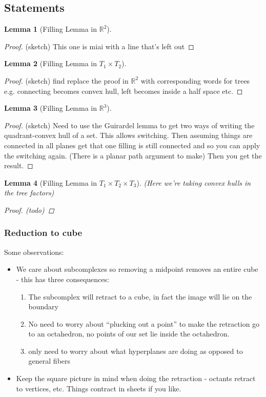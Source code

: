 \documentclass{article}
\theoremstyle{mystyle}
\newtheorem{lem}{Lemma}[section]
\theoremstyle{remark}
\begin{document}
\subsection{Statements}

\begin{lem}
    [Filling Lemma in \(\mathbb{R}^{2}\)]
\end{lem}
\begin{proof}
    (sketch) This one is miai with a line that's left out
\end{proof}
\begin{lem}
    [Filling Lemma in \(T_{1} \times T_{2}\)]
\end{lem}
\begin{proof}
    (sketch) find replace the proof in \(\mathbb{R}^{2}\) with corresponding words for trees e.g. connecting becomes convex hull, left becomes inside a half space etc.
\end{proof}
\begin{lem}
    [Filling Lemma in \(\mathbb{R}^{3}\)]
\end{lem}
\begin{proof}
    (sketch) Need to use the Guirardel lemma to get two ways of writing the quadrant-convex hull of a set. This allows switching. Then assuming things are connected in all planes get that one filling is still connected and so you can apply the switching again. (There is a planar path argument to make) Then you get the result.
\end{proof}
\begin{lem}
    [Filling Lemma in \(T_{1} \times T_{2} \times T_{3}\)]
    (Here we're taking convex hulls in the tree factors)
\begin{proof}
    (todo)
\end{proof}
\end{lem}


\subsubsection{Reduction to cube}

Some observations:
\begin{itemize}
	\item We care about subcomplexes so removing a midpoint removes an entire cube - this has three consequences:
		\begin{enumerate}
			\item The subcomplex will retract to a cube, in fact the image will lie on the boundary
			\item No need to worry about ``plucking out a point'' to make the retraction go to an octahedron, no points of our set lie inside the octahedron.
			\item only need to worry about what hyperplanes are doing as opposed to general fibers
		\end{enumerate}
	\item Keep the square picture in mind when doing the retraction - octants retract to vertices, etc. Things contract in sheets if you like.
\end{itemize}
\end{document}
